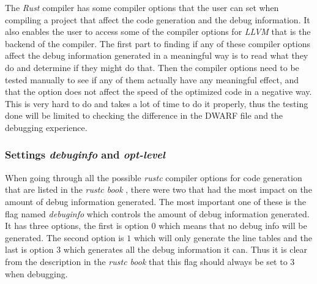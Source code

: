

The \emph{Rust} compiler has some compiler options that the user can set when compiling a project that affect the code generation and the debug information.
It also enables the user to access some of the compiler options for \emph{LLVM} that is the backend of the compiler.
The first part to finding if any of these compiler options affect the debug information generated in a meaningful way is to read what they do and determine if they might do that.
Then the compiler options need to be tested manually to see if any of them actually have any meaningful effect, and that the option does not affect the speed of the optimized code in a negative way.
This is very hard to do and takes a lot of time to do it properly, thus the testing done will be limited to checking the difference in the \gls{DWARF} file and the debugging experience.


\subsubsection{Settings \emph{debuginfo} and \emph{opt-level}}
When going through all the possible \emph{rustc} compiler options for code generation that are listed in the \emph{rustc book} \cite{rustc-book-codegen}, there were two that had the most impact on the amount of debug information generated.
The most important one of these is the flag named \emph{debuginfo} which controls the amount of debug information generated.
It has three options, the first is option $0$ which means that no debug info will be generated.
The second option is $1$ which will only generate the line tables and the last is option $3$ which generates all the debug information it can.
Thus it is clear from the description in the \emph{rustc book} that this flag should always be set to $3$ when debugging.


